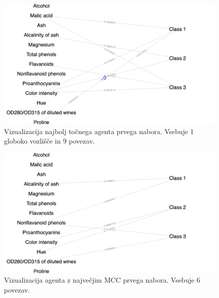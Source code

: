 \begin{figure}[H]
    \begin{center}
        \includegraphics[width=13cm]{wine/1/acc_g}
    \end{center}
    \caption{Vizualizacija najbolj točnega agenta prvega nabora. Vsebuje 1 globoko vozlišče in 9 povezav.}
    \label{fig:wine_acc_1_g}
\end{figure}

\begin{figure}[H]
    \begin{center}
        \includegraphics[width=13cm]{wine/1/mcc_g}
    \end{center}
    \caption{Vizualizacija agenta z največjim MCC prvega nabora. Vsebuje 6 povezav.}
    \label{fig:wine_mcc_1_g}
\end{figure}

